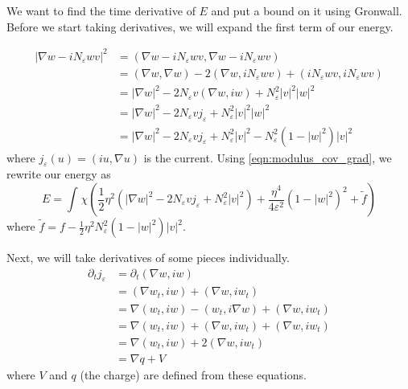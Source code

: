 \documentclass[a4paper]{article}
\begin{document}
We want to find the time derivative of $E$ and put a bound on it using Gronwall.
Before we start taking derivatives, we will expand the first term of our energy.

\begin{align}
  |\nabla w - iN_\varepsilon w v|^2 &= ( \nabla w - iN_\varepsilon w v , \nabla w - iN_\varepsilon w v ) \nonumber \\
  &= (\nabla w, \nabla w ) - 2 ( \nabla w, iN_\varepsilon w v ) + ( i N_\varepsilon w v, i N_\varepsilon w v ) \nonumber \\
  &= | \nabla w |^2 - 2 N_\varepsilon v ( \nabla w, iw ) + N_\varepsilon^2 |v|^2 |w|^2 \nonumber \\
  &= | \nabla w |^2 - 2 N_\varepsilon v j_\varepsilon + N_\varepsilon^2 |v|^2 |w|^2 \nonumber \\
  &= | \nabla w |^2 - 2 N_\varepsilon v j_\varepsilon + N_\varepsilon^2 |v|^2 - N_\varepsilon^2 ( 1 - |w|^2 )|v|^2
  \label{eqn:modulus_cov_grad}
\end{align}
where $j_\varepsilon(u) = (iu, \nabla u)$ is the current.
Using \eqref{eqn:modulus_cov_grad}, we rewrite our energy as
\begin{equation} \label{eqn:energy_form}
  E = \int_{}^{} \chi \left( \frac{1}{2} \eta^2 \left( | \nabla w |^2 - 2 N_\varepsilon v j_\varepsilon + N_\varepsilon^2 |v|^2
  \right) + \frac{\eta^4}{4 \varepsilon^2} ( 1 - |w|^2)^2 + \tilde{f} \right)
\end{equation}
where $\tilde{f} = f - \frac{1}{2} \eta^2 N_\varepsilon^2 (1 - |w|^2) |v|^2$.

Next, we will take derivatives of some pieces individually.
\begin{align} \label{eqn:current_deriv}
  \partial_t j_\varepsilon &= \partial_t (\nabla w, iw) \nonumber \\
  &= ( \nabla w_t, iw ) + ( \nabla w, i w_t) \nonumber \\
  &= \nabla( w_t, iw) - (w_t, i \nabla w) + ( \nabla w, i w_t) \nonumber \\
  &= \nabla( w_t, iw) + (\nabla w, i w_t) + ( \nabla w, i w_t) \nonumber \\
  &= \nabla( w_t, iw) + 2(\nabla w, i w_t) \\
  &= \nabla q + V \nonumber
\end{align}
where $V$ and $q$ (the charge) are defined from these equations.
\end{document}
